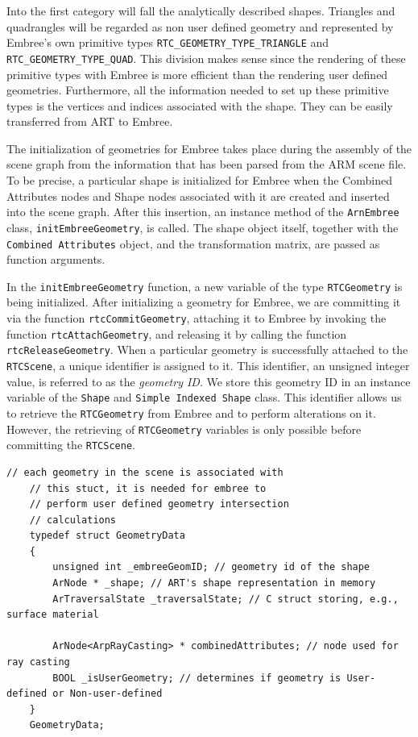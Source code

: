 Into the first category will fall the analytically described shapes. Triangles and quadrangles will be regarded as non user defined geometry and represented by Embree's own primitive types \texttt{RTC\_GEOMETRY\_TYPE\_TRIANGLE} and \texttt{RTC\_GEOMETRY\_TYPE\_QUAD}. This division makes sense since the rendering of these primitive types with Embree is more efficient than the rendering user defined geometries. Furthermore, all the information needed to set up these primitive types is the vertices and indices associated with the shape. They can be easily transferred from ART to Embree. 

The initialization of geometries for Embree takes place during the assembly of the scene graph from the information that has been parsed from the ARM scene file. To be precise, a particular shape is initialized for Embree when the Combined Attributes nodes and Shape nodes associated with it are created and inserted into the scene graph. After this insertion, an instance method of the \texttt{ArnEmbree} class, \texttt{initEmbreeGeometry}, is called. The shape object itself, together with the \texttt{Combined Attributes} object, and the transformation matrix, are passed as function arguments. 

In the \texttt{initEmbreeGeometry} function, a new variable of the type \texttt{RTCGeometry} is being initialized. 
After initializing a geometry for Embree, we are committing it via the function \texttt{rtcCommitGeometry}, attaching it to Embree by invoking the function \texttt{rtcAttachGeometry}, and releasing it by calling the function \texttt{rtcReleaseGeometry}. When a particular geometry is successfully attached to the \texttt{RTCScene}, a unique identifier is assigned to it. This identifier, an unsigned integer value, is referred to as the \emph{geometry ID}. We store this geometry ID in an instance variable of the \texttt{Shape} and \texttt{Simple Indexed Shape} class. This identifier allows us to retrieve the \texttt{RTCGeometry} from Embree and to perform alterations on it. However, the retrieving of \texttt{RTCGeometry} variables is only possible before committing the \texttt{RTCScene}. 

\begin{listing} 
	\begin{lstlisting}[caption={\texttt{C} struct associated with each initialized geometry.}, label={lst:geometry_data}]
	// each geometry in the scene is associated with
	// this stuct, it is needed for embree to
	// perform user defined geometry intersection
	// calculations
	typedef struct GeometryData 
	{
		unsigned int _embreeGeomID; // geometry id of the shape
		ArNode * _shape; // ART's shape representation in memory
		ArTraversalState _traversalState; // C struct storing, e.g., surface material
		
		ArNode<ArpRayCasting> * combinedAttributes; // node used for ray casting
		BOOL _isUserGeometry; // determines if geometry is User-defined or Non-user-defined
	}
	GeometryData;
	\end{lstlisting}
\end{listing}

